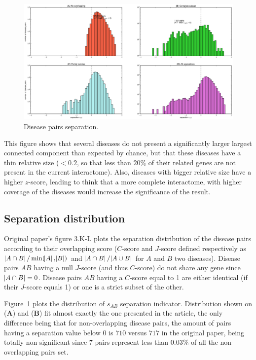 \documentclass[letterpaper]{article}
\begin{document}
	\begin{figure}[!t]
		\hspace{-1.8cm}
		\vspace{-1cm}
		\includegraphics[scale=.35]{images/s_AB_histograms.eps}
		\caption{Disease pairs separation.\label{fig:s_AB histogram}}
	\end{figure}

	This figure shows that several diseases do not present a significantly larger largest connected component
	than expected by chance, but that these diseases have a thin relative size ($< 0.2$, so that less than $20\%$
	of their related genes are not present in the current interactome). Also, diseases with bigger relative size
	have a higher $z$-score, leading to think that a more complete interactome, with higher coverage of the diseases
	would increase the significance of the result.

	\subsection{Separation distribution}
	Original paper's figure 3.K-L plots the separation distribution of the disease pairs according to their
	overlapping score ($C$-score and $J$-score defined respectively as $\abs {A \cap B}/\min(\abs A, \abs B)$ and
	$\abs {A \cap B}/\abs {A \cup B}$ for $A$ and $B$ two diseases). Disease pairs $AB$ having a null $J$-score
	(and thus $C$-score) do not share any gene since $\abs {A \cap B} = 0$. Disease pairs $AB$ having a $C$-score
	equal to 1 are either identical (if their $J$-score equals 1) or one is a strict subset of the other.

	Figure~\ref{fig:s_AB histogram} plots the distribution of $s_{AB}$ separation indicator.
	Distribution shown on ({\bf A}) and ({\bf B}) fit almost exactly the one presented in the article, the only difference
	being that for non-overlapping disease pairs, the amount of pairs having a separation value below 0 is $710$
	versus $717$ in the original paper, being totally non-significant since $7$ pairs represent less than
	$0.03\%$ of all the non-overlapping pairs set.
\end{document}
